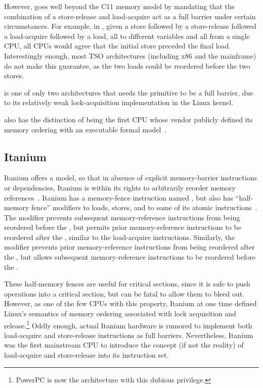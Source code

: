 However,  goes well beyond the C11 memory model by mandating that
the combination of a store-release and load-acquire act as a full
barrier under certain circumstances.
For example, in , given a store followed by a store-release followed
a load-acquire followed by a load, all to different variables and all from
a single CPU, all CPUs
would agree that the initial store preceded the final load.
Interestingly enough, most TSO architectures (including x86 and the
mainframe) do not make this guarantee, as the two loads could be
reordered before the two stores.

 is one of only two architectures that needs the
 primitive to be a full barrier,
due to its relatively weak lock-acquisition implementation in
the Linux kernel.

 also has the distinction of being the first CPU whose vendor publicly
defined its memory ordering with an executable formal model~\cite{ARMv8A:2017}.

\subsection{Itanium}
\label{sec:memorder:Itanium}

Itanium offers a 
model, so that in absence of explicit
memory-barrier instructions or dependencies, Itanium is within its rights
to arbitrarily reorder memory references~\cite{IntelItanium02v2}.
Itanium has a memory-fence instruction named , but also has
``half-memory fence'' modifiers to loads, stores, and to some of its atomic
instructions~\cite{IntelItanium02v3}.
The  modifier prevents subsequent memory-reference instructions
from being reordered before the , but permits
prior memory-reference instructions to be reordered after the ,
similar to the  load-acquire instructions.
Similarly, the  modifier prevents prior memory-reference
instructions from being reordered after the , but allows
subsequent memory-reference instructions to be reordered before
the .

These half-memory fences are useful for critical sections, since
it is safe to push operations into a critical section, but can be
fatal to allow them to bleed out.
However, as one of the few CPUs with this property, Itanium at one
time defined Linux's semantics of memory ordering associated with lock
acquisition and release.\footnote{
	PowerPC is now the architecture with this dubious privilege.}
Oddly enough, actual Itanium hardware is rumored to implement
both load-acquire and store-release instructions as full barriers.
Nevertheless, Itanium was the first mainstream CPU to introduce the concept
(if not the reality) of load-acquire and store-release into its
instruction set.

